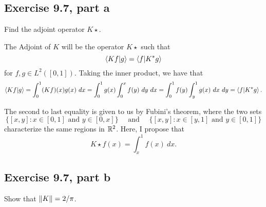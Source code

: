 \subsection{Exercise 9.7, part a}
Find the adjoint operator $K\star$.
\partbreak
\begin{solution}

    The Adjoint of $K$ will be the operator $K\star$ such that
    \[\braket{Kf}{g} = \braket{f}{K^{*} g}\]
    for $f, g \in L^2([0, 1])$. Taking the inner product, we have that 
    \[\braket{Kf}{g} = \int_0^1(Kf)(x)g(x)\ dx = \int_0^1 g(x)\int_0^x f(y) \ dy \ dx = \int_0^1 f(y)\int_y^1 g(x) \ dx \ dy = \braket{f}{K\star g}.\]
    
    The second to last equality is given to us by Fubini's theorem, where the two sets 
    \[\{[x, y] : x \in [0, 1] \text{ and } y \in [0, x]\} \quad \text{ and } \quad\{[x, y] : x \in [y, 1] \text{ and } y \in [0, 1]\}\]
    characterize the same regions in $\mathbb{R}^2$. Here, I propose that 
    \[K\star f(x) = \int_x^1 f(x) \ dx.\]
    
\end{solution}
\newpage
\subsection{Exercise 9.7, part b}
Show that $\norm{K} = 2/\pi$.
\partbreak
\newcommand{\px}{\frac{\partial}{\partial x}}
\newcommand{\ppx}{\frac{\partial^2}{\partial x^2}}

